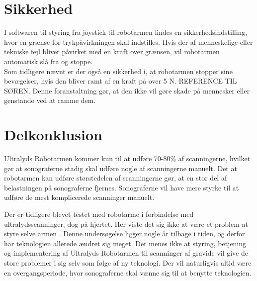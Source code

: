 \section{Sikkerhed}
I softwaren til styring fra joystick til robotarmen findes en sikkerhedsindstilling, hvor en grænse for trykpåvirkningen skal indstilles. Hvis der af menneskelige eller tekniske fejl bliver påvirket med en kraft over grænsen, vil robotarmen automatisk slå fra og stoppe. \\
Som tidligere nævnt er der også en sikkerhed i, at robotarmen stopper sine bevægelser, hvis den bliver ramt af en kraft på over 5 N. REFERENCE TIL SØREN. Denne foranstaltning gør, at den ikke vil gøre skade på mennesker eller genstande ved at ramme dem. 

\section{Delkonklusion}
Ultralyds Robotarmen kommer kun til at udføre 70-80\% af scanningerne, hvilket gør at sonograferne stadig skal udføre nogle af scanningerne manuelt. Det at robotarmen kan udføre størstedelen af scanningerne gør, at en stor del af belastningen på sonograferne fjernes. Sonograferne vil have mere styrke til at udføre de mest komplicerede scanninger manuelt.

Der er tidligere blevet testet med robotarme i forbindelse med ultralydsscanninger, dog på hjertet. Her viste det sig ikke at være et problem at styre selve armen \cite{Hjerterobot}.  Denne undersøgelse ligger nogle år tilbage i tiden, og derfor har teknologien allerede ændret sig meget. Det menes ikke at styring, betjening og implementering af Ultralyds Robotarmen til scanninger af gravide vil give de store problemer i sig selv som følge af ny teknologi. Der vil naturligvis altid være en overgangsperiode, hvor sonograferne skal vænne sig til at benytte teknologien. 